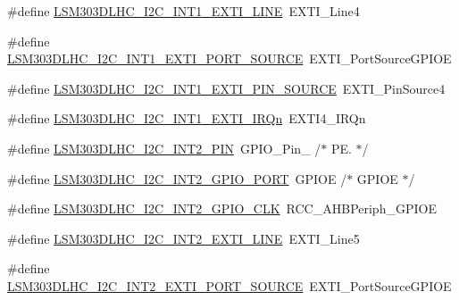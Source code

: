 \begin{DoxyCompactItemize}
\item 
\#define \hyperlink{group__STM32F3__DISCOVERY__LSM303DLHC__Exported__Constants_gafbabee0c8b0ece30187c9f733736d31c}{L\+S\+M303\+D\+L\+H\+C\+\_\+\+I2\+C\+\_\+\+I\+N\+T1\+\_\+\+E\+X\+T\+I\+\_\+\+L\+I\+N\+E}~E\+X\+T\+I\+\_\+\+Line4
\item 
\#define \hyperlink{group__STM32F3__DISCOVERY__LSM303DLHC__Exported__Constants_ga9336f751a3ee46a2872a23341333aebd}{L\+S\+M303\+D\+L\+H\+C\+\_\+\+I2\+C\+\_\+\+I\+N\+T1\+\_\+\+E\+X\+T\+I\+\_\+\+P\+O\+R\+T\+\_\+\+S\+O\+U\+R\+C\+E}~E\+X\+T\+I\+\_\+\+Port\+Source\+G\+P\+I\+O\+E
\item 
\#define \hyperlink{group__STM32F3__DISCOVERY__LSM303DLHC__Exported__Constants_ga0ecbee3e94b04ac6d16fc359d0b8e7bb}{L\+S\+M303\+D\+L\+H\+C\+\_\+\+I2\+C\+\_\+\+I\+N\+T1\+\_\+\+E\+X\+T\+I\+\_\+\+P\+I\+N\+\_\+\+S\+O\+U\+R\+C\+E}~E\+X\+T\+I\+\_\+\+Pin\+Source4
\item 
\#define \hyperlink{group__STM32F3__DISCOVERY__LSM303DLHC__Exported__Constants_ga955546b2597fcee5318c9cbe4b3542f1}{L\+S\+M303\+D\+L\+H\+C\+\_\+\+I2\+C\+\_\+\+I\+N\+T1\+\_\+\+E\+X\+T\+I\+\_\+\+I\+R\+Qn}~E\+X\+T\+I4\+\_\+\+I\+R\+Qn
\item 
\#define \hyperlink{group__STM32F3__DISCOVERY__LSM303DLHC__Exported__Constants_ga464c2702f62a78daf2dc88bf8a33bf24}{L\+S\+M303\+D\+L\+H\+C\+\_\+\+I2\+C\+\_\+\+I\+N\+T2\+\_\+\+P\+I\+N}~G\+P\+I\+O\+\_\+\+Pin\+\_                  /$\ast$ P\+E. $\ast$/
\item 
\#define \hyperlink{group__STM32F3__DISCOVERY__LSM303DLHC__Exported__Constants_ga91b9b02f3b88f4cbd924b079c62658fe}{L\+S\+M303\+D\+L\+H\+C\+\_\+\+I2\+C\+\_\+\+I\+N\+T2\+\_\+\+G\+P\+I\+O\+\_\+\+P\+O\+R\+T}~G\+P\+I\+O\+E                       /$\ast$ G\+P\+I\+O\+E $\ast$/
\item 
\#define \hyperlink{group__STM32F3__DISCOVERY__LSM303DLHC__Exported__Constants_ga17c054411bb3a14dd5977e45dc9973c4}{L\+S\+M303\+D\+L\+H\+C\+\_\+\+I2\+C\+\_\+\+I\+N\+T2\+\_\+\+G\+P\+I\+O\+\_\+\+C\+L\+K}~R\+C\+C\+\_\+\+A\+H\+B\+Periph\+\_\+\+G\+P\+I\+O\+E
\item 
\#define \hyperlink{group__STM32F3__DISCOVERY__LSM303DLHC__Exported__Constants_ga5052c920398cb30881e4036f6d2c071d}{L\+S\+M303\+D\+L\+H\+C\+\_\+\+I2\+C\+\_\+\+I\+N\+T2\+\_\+\+E\+X\+T\+I\+\_\+\+L\+I\+N\+E}~E\+X\+T\+I\+\_\+\+Line5
\item 
\#define \hyperlink{group__STM32F3__DISCOVERY__LSM303DLHC__Exported__Constants_gacaddab273ebf4cb575d374e52f965772}{L\+S\+M303\+D\+L\+H\+C\+\_\+\+I2\+C\+\_\+\+I\+N\+T2\+\_\+\+E\+X\+T\+I\+\_\+\+P\+O\+R\+T\+\_\+\+S\+O\+U\+R\+C\+E}~E\+X\+T\+I\+\_\+\+Port\+Source\+G\+P\+I\+O\+E

\end{DoxyCompactItemize}
